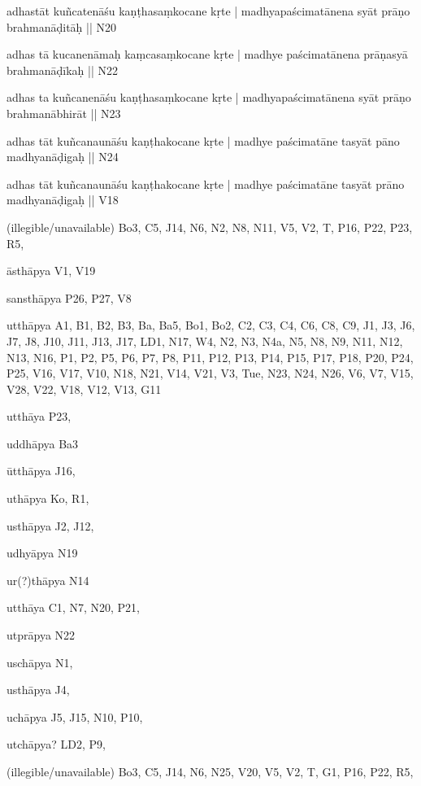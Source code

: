 \begin{marma}[hp02_009]
\begin{marma}[hp02_011]
\begin{marma}[hp02_46]
\item[adhastāt kuñcatenāśu kaṇṭhasaṃkocane kṛte | madhyapaścimatānena syāt prāṇo brahmanāḍitāḥ ||] N20
\item[adhas tā kucanenāmaḥ kaṃcasaṃkocane kṛte | madhye paścimatānena prāṇasyā brahmanāḍīkaḥ ||] N22
\item[adhas ta kuñcanenāśu kaṇṭhasaṃkocane kṛte | madhyapaścimatānena syāt prāṇo brahmanābhirāt ||] N23
\item[adhas tāt kuñcanaunāśu kaṇṭhakocane kṛte | madhye paścimatāne tasyāt pāno madhyanāḍigaḥ ||] N24
\item[adhas tāt kuñcanaunāśu kaṇṭhakocane kṛte | madhye paścimatāne tasyāt prāno madhyanāḍigaḥ ||] V18
\item[(illegible/unavailable)] Bo3, C5, J14, N6, N2, N8, N11, V5, V2, T, P16, P22, P23, R5,
  \begin{description}

    \end{description}
 \end{marma}

 \begin{marma}[hp02_48b]
\item[āsthāpya] V1, V19
\item[sansthāpya] P26, P27, V8
\item[utthāpya] A1, B1, B2, B3, Ba, Ba5, Bo1, Bo2, C2, C3, C4, C6, C8, C9, J1, J3, J6, J7, J8, J10, J11, J13, J17, LD1, N17, W4, N2, N3, N4a, N5, N8, N9, N11, N12, N13, N16, P1, P2, P5, P6, P7, P8, P11, P12, P13, P14, P15, P17, P18, P20, P24, P25, V16, V17, V10, N18, N21, V14, V21, V3, Tue, N23, N24, N26, V6, V7, V15, V28, V22, V18, V12, V13, G11
\item[utthāya] P23,
\item[uddhāpya] Ba3
\item[ūtthāpya] J16,
\item[uthāpya] Ko, R1, 
\item[usthāpya] J2, J12, 
\item[udhyāpya] N19
\item[ur(?)thāpya] N14
\item[utthāya] C1, N7, N20, P21, 
\item[utprāpya] N22
\item[uschāpya] N1, 
\item[usthāpya] J4,
\item[uchāpya] J5, J15, N10, P10, 
\item[utchāpya?] LD2, P9, 
\item[(illegible/unavailable)] Bo3, C5, J14, N6, N25, V20, V5, V2, T, G1, P16, P22, R5,


\end{marma}
\end{marma}
\end{marma}
